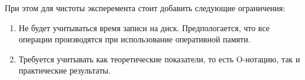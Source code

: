 При этом для чистоты эксперемента стоит добавить следующие ограничения:
\begin{enumerate}
    \item Не будет учитываться время записи на диск. Предпологается, что все операции производятся при использование оперативной памяти.
    \item Требуется учитывать как теоретические показатели, то есть O-нотацию, так и практические результаты.
\end{enumerate}

